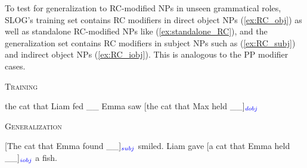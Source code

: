 \noindent To test for generalization to RC-modified NPs in unseen grammatical roles, SLOG's training set contains RC modifiers in direct object NPs (\ref{ex:RC_obj}) as well as standalone RC-modified NPs like (\ref{ex:standalone_RC}), and the generalization set contains RC modifiers in subject NPs such as (\ref{ex:RC_subj}) and indirect object NPs (\ref{ex:RC_iobj}). This is analogous to the PP modifier cases.
\vspace{-0.5\baselineskip}
\begin{exe}
\ex \label{ex:train_RC}\textsc{Training} 
\begin{xlist}
  \ex \label{ex:standalone_RC} the cat that Liam fed \_\_
  \ex \label{ex:RC_obj} Emma saw [the cat that Max held \_\_]$_{\textcolor{blue}{dobj}}$
\end{xlist} 
\ex \textsc{Generalization}
\begin{xlist}
    \ex \label{ex:RC_subj} [The cat that Emma found \_\_]$_{\textcolor{blue}{subj}}$ smiled.
    \ex \label{ex:RC_iobj} Liam gave [a cat that Emma held \_\_]$_{\textcolor{blue}{iobj}}$ a fish.
\end{xlist} 
\end{exe}
\vspace{-0.5\baselineskip}

